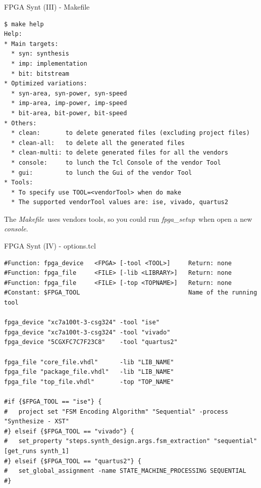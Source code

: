 \documentclass{beamer}
\newcommand{\fpgasetup}      {\textit{fpga\_setup}}
\newcommand{\console}        {\textit{console}}
\newcommand{\makefile}       {\textit{Makefile}}
\begin{document}
\begin{frame}[fragile]{FPGA Synt (III) - Makefile}
  \tiny
  \begin{verbatim}
$ make help 
Help:
* Main targets:
  * syn: synthesis
  * imp: implementation
  * bit: bitstream
* Optimized variations:
  * syn-area, syn-power, syn-speed
  * imp-area, imp-power, imp-speed
  * bit-area, bit-power, bit-speed
* Others:
  * clean:       to delete generated files (excluding project files)
  * clean-all:   to delete all the generated files
  * clean-multi: to delete generated files for all the vendors
  * console:     to lunch the Tcl Console of the vendor Tool
  * gui:         to lunch the Gui of the vendor Tool
* Tools:
  * To specify use TOOL=<vendorTool> when do make
  * The supported vendorTool values are: ise, vivado, quartus2
  \end{verbatim}
  \begin{alertblock}{}
    \small
    The \makefile\ uses vendors tools, so you could run \fpgasetup\ when open
    a new \console.
  \end{alertblock}
\end{frame}

\begin{frame}[fragile]{FPGA Synt (IV) - options.tcl}
  \tiny
  \begin{verbatim}
#Function: fpga_device   <FPGA> [-tool <TOOL>]     Return: none
#Function: fpga_file     <FILE> [-lib <LIBRARY>]   Return: none
#Function: fpga_file     <FILE> [-top <TOPNAME>]   Return: none
#Constant: $FPGA_TOOL                              Name of the running tool

fpga_device "xc7a100t-3-csg324" -tool "ise"
fpga_device "xc7a100t-3-csg324" -tool "vivado"
fpga_device "5CGXFC7C7F23C8"    -tool "quartus2"

fpga_file "core_file.vhdl"      -lib "LIB_NAME"
fpga_file "package_file.vhdl"   -lib "LIB_NAME"
fpga_file "top_file.vhdl"       -top "TOP_NAME"

#if {$FPGA_TOOL == "ise"} {
#   project set "FSM Encoding Algorithm" "Sequential" -process "Synthesize - XST"
#} elseif {$FPGA_TOOL == "vivado"} {
#   set_property "steps.synth_design.args.fsm_extraction" "sequential" [get_runs synth_1]
#} elseif {$FPGA_TOOL == "quartus2"} {
#   set_global_assignment -name STATE_MACHINE_PROCESSING SEQUENTIAL
#}
  \end{verbatim}
\end{frame}
\end{document}
